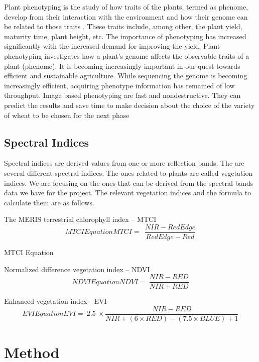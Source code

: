 \documentclass[sigconf, nonacm, natbib, screen, balance=False]{acmart}
\begin{document}
Plant phenotyping is the study of how traits of the plants, termed as phenome, develop from their interaction with the environment and how their genome can be related to those traits \cite{minervini}. These traits include, among other, the plant yield, maturity time, plant height, etc. The importance of phenotyping has increased significantly with the increased demand for improving the yield.
Plant phenotyping investigates how a plant's genome affects the observable traits of a plant (phenome). It is becoming increasingly important in our quest towards efficient and sustainable agriculture. While sequencing the genome is becoming increasingly efficient, acquiring phenotype information has remained of low throughput. 
Image based phenotyping are fast and nondestructive. They can predict the results and save time to make decision about the choice of the variety of wheat to be chosen for the next phase

\subsection{Spectral Indices}\label{sec:aspect1}

Spectral indices are derived values from one or more reflection bands. The are several different spectral indices. The ones related to plants are called vegetation indices. We are focusing on the ones that can be derived from the spectral bands data we have for the project. The relevant vegetation indices and the formula to calculate them are as follows.

	The MERIS terrestrial chlorophyll index – MTCI
\begin{displaymath}
  \caption{MTCI Equation}
  \label{eq:mtci}
MTCI=\ \ \frac{NIR-RedEdge}{RedEdge-Red}
\end{displaymath}
  \caption{MTCI Equation}

	Normalized difference vegetation index – NDVI
\begin{displaymath}
  \caption{NDVI Equation}
  \label{eq:ndvi}
NDVI=\ \frac{NIR-RED}{NIR+RED}
\end{displaymath}

	Enhanced vegetation index - EVI
\begin{displaymath}
  \caption{EVI Equation}
  \label{eq:evi}
EVI=\ 2.5\ \times\frac{NIR-RED}{NIR+(6\times R E D)-(7.5\times B L U E)+1}
\end{displaymath}


\section{Method}\label{sec:theory}
\end{document}
